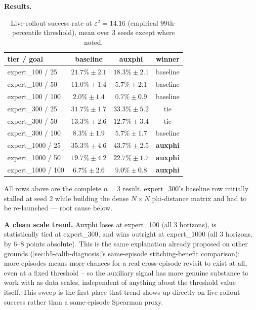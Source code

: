 \documentclass[11pt]{article}
\begin{document}
\textbf{Results.}

\begin{table}[h]
\centering
\small
\caption{Live-rollout success rate at $\varepsilon^2=14.16$ (empirical $99$th-percentile
threshold), mean over 3 seeds except where noted.}
\begin{tabular}{lccc}
\toprule
tier / goal & baseline & \textbf{auxphi} & winner \\
\midrule
expert\_100 / 25  & $21.7\% \pm 2.1$ & $18.3\% \pm 2.1$ & baseline \\
expert\_100 / 50  & $11.0\% \pm 1.4$ & $5.7\% \pm 2.1$  & baseline \\
expert\_100 / 100 & $2.0\% \pm 1.4$  & $0.7\% \pm 0.9$  & baseline \\
\addlinespace
expert\_300 / 25  & $31.7\% \pm 1.7$ & $33.3\% \pm 5.2$ & tie \\
expert\_300 / 50  & $13.3\% \pm 2.6$ & $12.7\% \pm 3.4$ & tie \\
expert\_300 / 100 & $8.3\% \pm 1.9$  & $5.7\% \pm 1.7$  & baseline \\
\addlinespace
expert\_1000 / 25  & $35.3\% \pm 4.6$ & $\mathbf{43.7\%} \pm 2.5$ & \textbf{auxphi} \\
expert\_1000 / 50  & $19.7\% \pm 4.2$ & $\mathbf{22.7\%} \pm 1.7$ & \textbf{auxphi} \\
expert\_1000 / 100 & $6.7\% \pm 2.6$  & $\mathbf{9.0\%} \pm 0.8$  & \textbf{auxphi} \\
\bottomrule
\end{tabular}
\end{table}

All rows above are the complete $n{=}3$ result. expert\_300's baseline row initially stalled at
seed 2 while building the dense $N{\times}N$ phi-distance matrix and had to be re-launched ---
root cause below.

\textbf{A clean scale trend.} Auxphi loses at expert\_100 (all 3 horizons), is statistically
tied at expert\_300, and wins outright at expert\_1000 (all 3 horizons, by $6$--$8$ points
absolute). This is the same explanation already proposed on other grounds
(\cref{sec:b5-calib-diagnosis}'s same-episode stitching-benefit comparison): more episodes
means more chances for a real cross-episode revisit to exist at all, even at a fixed threshold
-- so the auxiliary signal has more genuine substance to work with as data scales, independent
of anything about the threshold value itself. This sweep is the first place that trend shows up
directly on live-rollout success rather than a same-episode Spearman proxy.
\end{document}
